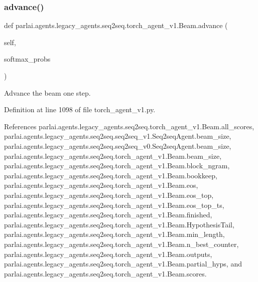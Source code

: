 \subsubsection{\texorpdfstring{advance()}{advance()}}
{\footnotesize\ttfamily def parlai.\+agents.\+legacy\+\_\+agents.\+seq2seq.\+torch\+\_\+agent\+\_\+v1.\+Beam.\+advance (\begin{DoxyParamCaption}\item[{}]{self,  }\item[{}]{softmax\+\_\+probs }\end{DoxyParamCaption})}

\begin{DoxyVerb}Advance the beam one step.\end{DoxyVerb}
 

Definition at line 1098 of file torch\+\_\+agent\+\_\+v1.\+py.



References parlai.\+agents.\+legacy\+\_\+agents.\+seq2seq.\+torch\+\_\+agent\+\_\+v1.\+Beam.\+all\+\_\+scores, parlai.\+agents.\+legacy\+\_\+agents.\+seq2seq.\+seq2seq\+\_\+v1.\+Seq2seq\+Agent.\+beam\+\_\+size, parlai.\+agents.\+legacy\+\_\+agents.\+seq2seq.\+seq2seq\+\_\+v0.\+Seq2seq\+Agent.\+beam\+\_\+size, parlai.\+agents.\+legacy\+\_\+agents.\+seq2seq.\+torch\+\_\+agent\+\_\+v1.\+Beam.\+beam\+\_\+size, parlai.\+agents.\+legacy\+\_\+agents.\+seq2seq.\+torch\+\_\+agent\+\_\+v1.\+Beam.\+block\+\_\+ngram, parlai.\+agents.\+legacy\+\_\+agents.\+seq2seq.\+torch\+\_\+agent\+\_\+v1.\+Beam.\+bookkeep, parlai.\+agents.\+legacy\+\_\+agents.\+seq2seq.\+torch\+\_\+agent\+\_\+v1.\+Beam.\+eos, parlai.\+agents.\+legacy\+\_\+agents.\+seq2seq.\+torch\+\_\+agent\+\_\+v1.\+Beam.\+eos\+\_\+top, parlai.\+agents.\+legacy\+\_\+agents.\+seq2seq.\+torch\+\_\+agent\+\_\+v1.\+Beam.\+eos\+\_\+top\+\_\+ts, parlai.\+agents.\+legacy\+\_\+agents.\+seq2seq.\+torch\+\_\+agent\+\_\+v1.\+Beam.\+finished, parlai.\+agents.\+legacy\+\_\+agents.\+seq2seq.\+torch\+\_\+agent\+\_\+v1.\+Beam.\+Hypothesis\+Tail, parlai.\+agents.\+legacy\+\_\+agents.\+seq2seq.\+torch\+\_\+agent\+\_\+v1.\+Beam.\+min\+\_\+length, parlai.\+agents.\+legacy\+\_\+agents.\+seq2seq.\+torch\+\_\+agent\+\_\+v1.\+Beam.\+n\+\_\+best\+\_\+counter, parlai.\+agents.\+legacy\+\_\+agents.\+seq2seq.\+torch\+\_\+agent\+\_\+v1.\+Beam.\+outputs, parlai.\+agents.\+legacy\+\_\+agents.\+seq2seq.\+torch\+\_\+agent\+\_\+v1.\+Beam.\+partial\+\_\+hyps, and parlai.\+agents.\+legacy\+\_\+agents.\+seq2seq.\+torch\+\_\+agent\+\_\+v1.\+Beam.\+scores.

\mbox{\label{classparlai_1_1agents_1_1legacy__agents_1_1seq2seq_1_1torch__agent__v1_1_1Beam_a6d43c0169b15e4d6a754a91a25137709}} 

